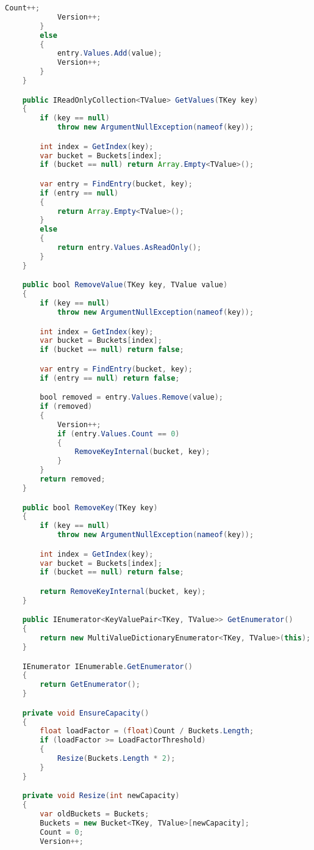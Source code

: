 \documentclass[12pt]{article}
\begin{document}
\begin{lstlisting}[language=Java]
            Count++;
            Version++;
        }
        else
        {
            entry.Values.Add(value);
            Version++;
        }
    }

    public IReadOnlyCollection<TValue> GetValues(TKey key)
    {
        if (key == null)
            throw new ArgumentNullException(nameof(key));

        int index = GetIndex(key);
        var bucket = Buckets[index];
        if (bucket == null) return Array.Empty<TValue>();

        var entry = FindEntry(bucket, key);
        if (entry == null)
        {
            return Array.Empty<TValue>();
        }
        else
        {
            return entry.Values.AsReadOnly();
        }
    }

    public bool RemoveValue(TKey key, TValue value)
    {
        if (key == null)
            throw new ArgumentNullException(nameof(key));

        int index = GetIndex(key);
        var bucket = Buckets[index];
        if (bucket == null) return false;

        var entry = FindEntry(bucket, key);
        if (entry == null) return false;

        bool removed = entry.Values.Remove(value);
        if (removed)
        {
            Version++;
            if (entry.Values.Count == 0)
            {
                RemoveKeyInternal(bucket, key);
            }
        }
        return removed;
    }

    public bool RemoveKey(TKey key)
    {
        if (key == null)
            throw new ArgumentNullException(nameof(key));

        int index = GetIndex(key);
        var bucket = Buckets[index];
        if (bucket == null) return false;

        return RemoveKeyInternal(bucket, key);
    }

    public IEnumerator<KeyValuePair<TKey, TValue>> GetEnumerator()
    {
        return new MultiValueDictionaryEnumerator<TKey, TValue>(this);
    }

    IEnumerator IEnumerable.GetEnumerator()
    {
        return GetEnumerator();
    }

    private void EnsureCapacity()
    {
        float loadFactor = (float)Count / Buckets.Length;
        if (loadFactor >= LoadFactorThreshold)
        {
            Resize(Buckets.Length * 2);
        }
    }

    private void Resize(int newCapacity)
    {
        var oldBuckets = Buckets;
        Buckets = new Bucket<TKey, TValue>[newCapacity];
        Count = 0;
        Version++;


\end{lstlisting}
\end{document}

